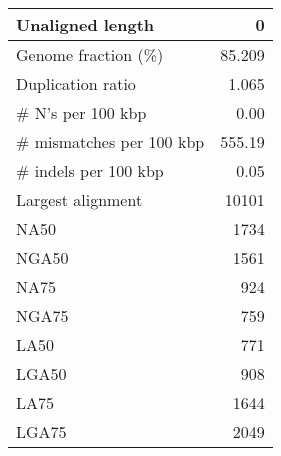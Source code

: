 \documentclass[12pt,a4paper]{article}
\begin{document}
\begin{table}[ht]
\begin{center}
\begin{tabular}{|l*{1}{|r}|}
Unaligned length & 0 \\ \hline
Genome fraction (\%) & 85.209 \\ \hline
Duplication ratio & 1.065 \\ \hline
\# N's per 100 kbp & 0.00 \\ \hline
\# mismatches per 100 kbp & 555.19 \\ \hline
\# indels per 100 kbp & 0.05 \\ \hline
Largest alignment & 10101 \\ \hline
NA50 & 1734 \\ \hline
NGA50 & 1561 \\ \hline
NA75 & 924 \\ \hline
NGA75 & 759 \\ \hline
LA50 & 771 \\ \hline
LGA50 & 908 \\ \hline
LA75 & 1644 \\ \hline
LGA75 & 2049 \\ \hline
\end{tabular}
\end{center}
\end{table}
\end{document}
